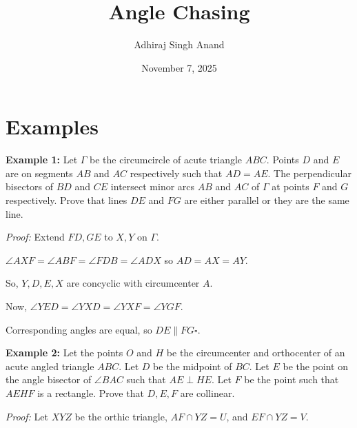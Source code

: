 \documentclass[10pt,letterpaper]{article}
\title{Angle Chasing}
\author{Adhiraj Singh Anand}
\date{November 7, 2025}
\begin{document}
\maketitle\section{Examples}
\begin{tcolorbox}[breakable,title={IMO 2018 P1},colbacktitle=black!4,coltitle=black,fonttitle=\normalfont]
\textbf{Example 1:} Let $\Gamma$ be the circumcircle of acute triangle $ABC$. Points $D$ and $E$ are on segments $AB$ and $AC$ respectively such that $AD = AE$. The perpendicular bisectors of $BD$ and $CE$ intersect minor arcs $AB$ and $AC$ of $\Gamma$ at points $F$ and $G$ respectively. Prove that lines $DE$ and $FG$ are either parallel or they are the same line.

\end{tcolorbox}
\textit{Proof:}
Extend $FD, GE$ to $X,Y$ on $\Gamma$.

$\angle AXF=\angle ABF=\angle FDB=\angle ADX$ so $AD=AX=AY$.

So, $Y,D,E,X$ are concyclic with circumcenter $A$.

Now, $\angle YED=\angle YXD=\angle YXF=\angle YGF$.

Corresponding angles are equal, so $DE\parallel FG\square$.
\nopagebreak[4]\par{}
\par\vspace{12pt}
\begin{tcolorbox}[breakable,title={Indian TST 2019 Practice Test 2 P1},colbacktitle=black!4,coltitle=black,fonttitle=\normalfont]
\textbf{Example 2:} Let the points $O$ and $H$ be the circumcenter and orthocenter of an acute angled triangle $ABC.$ Let $D$ be the midpoint of $BC.$ Let $E$ be the point on the angle bisector of $\angle BAC$ such that $AE\perp HE.$ Let $F$ be the point such that $AEHF$ is a rectangle. Prove that $D,E,F$ are collinear.
\end{tcolorbox}
\textit{Proof:}
Let $XYZ$ be the orthic triangle, $AF\cap YZ=U$, and $EF \cap YZ=V$.
\end{document}
